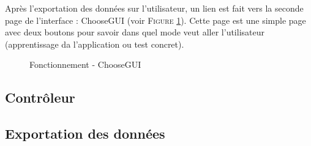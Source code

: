 Après l'exportation des données sur l'utilisateur, un lien est fait vers la seconde page de l'interface : ChooseGUI (voir \textsc{Figure} \ref{ChooseGUI}). Cette page est une simple page avec deux boutons pour savoir dans quel mode veut aller l'utilisateur (apprentissage da l'application ou test concret).

\newpage

\begin{figure}[!ht]
\begin{center}
  \caption{Fonctionnement - ChooseGUI}
  \label{ChooseGUI} 
\end{center}
\end{figure}

\subsection{Contrôleur}
\lipsum[7]


\subsection{Exportation des données}
\lipsum[8]